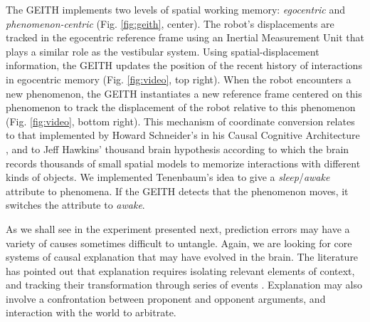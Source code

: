 \documentclass[runningheads]{llncs}
\begin{document}
The GEITH implements two levels of spatial working memory: \textit{egocentric} and \textit{phenomenon-centric} (Fig. \ref{fig:geith}, center).  
The robot's displacements are tracked in the egocentric reference frame using an Inertial Measurement Unit that plays a similar role as the vestibular system. 
Using spatial-displacement information, the GEITH updates the position of the recent history of interactions in egocentric memory (Fig. \ref{fig:video}, top right).
When the robot encounters a new phenomenon, the GEITH instantiates a new reference frame centered on this phenomenon to track the displacement of the robot relative to this phenomenon (Fig. \ref{fig:video}, bottom right). 
This mechanism of coordinate conversion relates to that implemented by Howard Schneider's in his Causal Cognitive Architecture \cite{schneider_enabling_2020}, and to 
Jeff Hawkins' thousand brain hypothesis \cite{hawkins_framework_2019} according to which the brain records thousands of small spatial models to memorize interactions with different kinds of objects.
We implemented Tenenbaum's idea to give a \textit{sleep}/\textit{awake} attribute to phenomena. If the GEITH detects that the phenomenon moves, it switches the attribute to \textit{awake}.

As we shall see in the experiment presented next, prediction errors may have a variety of causes sometimes difficult to untangle. 
Again, we are looking for core systems of causal explanation that may have evolved in the brain.
The literature has pointed out that explanation requires isolating relevant elements of context, and tracking their transformation through series of events \cite{thorisson_explanation_2021}. 
Explanation may also involve a confrontation between proponent and opponent arguments, and interaction with the world to arbitrate. 
\end{document}
